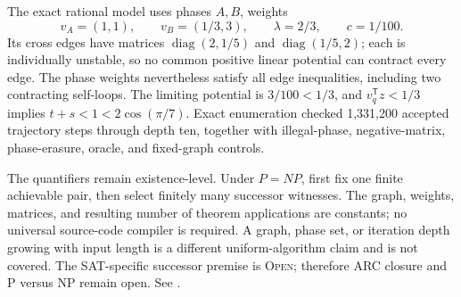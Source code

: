 The exact rational model uses phases \(A,B\), weights
\[
 v_A=(1,1),\qquad v_B=(1/3,3),\qquad \lambda=2/3,\qquad c=1/100.
\]
Its cross edges have matrices
\(\operatorname{diag}(2,1/5)\) and
\(\operatorname{diag}(1/5,2)\); each is individually unstable, so no common
positive linear potential can contract every edge.  The phase weights
nevertheless satisfy all edge inequalities, including two contracting
self-loops.  The limiting potential is \(3/100<1/3\), and
\(v_q^{\mathsf T}z<1/3\) implies \(t+s<1<2\cos(\pi/7)\).
Exact enumeration checked 1,331,200 accepted trajectory steps through depth
ten, together with illegal-phase, negative-matrix, phase-erasure, oracle,
and fixed-graph controls.

The quantifiers remain existence-level.  Under \(P=NP\), first fix one finite
achievable pair, then select finitely many successor witnesses.  The graph,
weights, matrices, and resulting number of theorem applications are constants;
no universal source-code compiler is required.  A graph, phase set, or
iteration depth growing with input length is a different uniform-algorithm
claim and is not covered.  The SAT-specific successor premise is
\textsc{Open}; therefore ARC closure and P versus NP remain open.
See .
